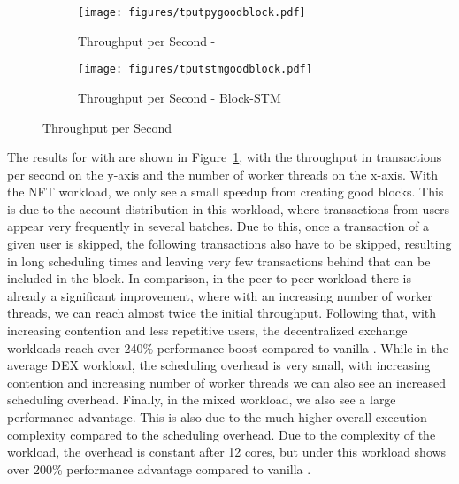 \begin{figure*}[t]
\begin{subfigure}{0.5\textwidth}
\texttt{[image: figures/tputpygoodblock.pdf]} 
\caption{Throughput per Second - \basesys}
\label{fig:tputpythia}
\end{subfigure}
\begin{subfigure}{0.5\textwidth}
\texttt{[image: figures/tputstmgoodblock.pdf]}
\caption{Throughput per Second - Block-STM}
\label{fig:tputblockstm}
\end{subfigure}
\caption{Throughput per Second}
\label{fig:image2}
\end{figure*}


The results for \sys with \basesys are shown in Figure~\ref{fig:tputpythia}, with the throughput in transactions per second on the y-axis and the number of worker threads on the x-axis. With the NFT workload, we only see a small speedup from creating good blocks. This is due to the account distribution in this workload, where transactions from users appear very frequently in several batches. Due to this, once a transaction of a given user is skipped, the following transactions also have to be skipped, resulting in long scheduling times and leaving very few transactions behind that can be included in the block. In comparison, in the peer-to-peer workload there is already a significant improvement, where with an increasing number of worker threads, we can reach almost twice the initial throughput. Following that, with increasing contention and less repetitive users, the decentralized exchange workloads reach over 240\% performance boost compared to vanilla \basesys. While in the average DEX workload, the scheduling overhead is very small, with increasing contention and increasing number of worker threads we can also see an increased scheduling overhead.
Finally, in the mixed workload, we also see a large performance advantage. This is also due to the much higher overall execution complexity compared to the scheduling overhead. Due to the complexity of the workload, the overhead is constant after 12 cores, but \sys under this workload shows over 200\% performance advantage compared to vanilla \basesys.


